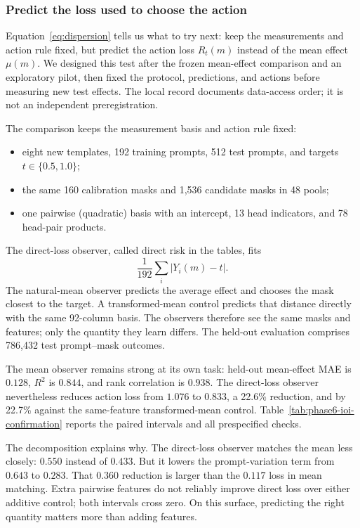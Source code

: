 \subsubsection{Predict the loss used to choose the action}
\label{sec:phase6-estimand}

Equation~\ref{eq:dispersion} tells us what to try next: keep the measurements
and action rule fixed, but predict the action loss $R_t(m)$ instead of the mean
effect $\mu(m)$. We designed this test after the frozen mean-effect comparison
and an exploratory pilot, then fixed the protocol, predictions, and actions
before measuring new test effects. The local record documents data-access
order; it is not an independent preregistration.

The comparison keeps the measurement basis and action rule fixed:

\begin{itemize}[itemsep=0.15em,topsep=0.25em]
  \item eight new templates, 192 training prompts, 512 test prompts, and
  targets $t\in\{0.5,1.0\}$;
  \item the same 160 calibration masks and 1,536 candidate masks in 48 pools;
  \item one pairwise (quadratic) basis with an intercept, 13 head indicators,
  and 78 head-pair products.
\end{itemize}

The direct-loss observer, called direct risk in the tables, fits
\[
\frac{1}{192}\sum_i |Y_i(m)-t|.
\]
The natural-mean observer predicts the average effect and chooses the mask
closest to the target. A transformed-mean control predicts that distance
directly with the same 92-column basis. The observers therefore see the same
masks and features; only the quantity they learn differs. The held-out
evaluation comprises 786,432 test prompt--mask outcomes.

The mean observer remains strong at its own task: held-out mean-effect MAE is
$0.128$, $R^2$ is $0.844$, and rank correlation is $0.938$. The direct-loss
observer nevertheless reduces action loss from $1.076$ to $0.833$, a 22.6\%
reduction, and by 22.7\% against the same-feature transformed-mean control.
Table~\ref{tab:phase6-ioi-confirmation} reports the paired intervals and all
prespecified checks.

The decomposition explains why. The direct-loss observer matches the mean less
closely: $0.550$ instead of $0.433$. But it lowers the prompt-variation term
from $0.643$ to $0.283$. That $0.360$ reduction is larger than the $0.117$ loss
in mean matching. Extra pairwise features do not reliably improve direct loss
over either additive control; both intervals cross zero. On this
surface, predicting the right quantity matters more than adding features.

